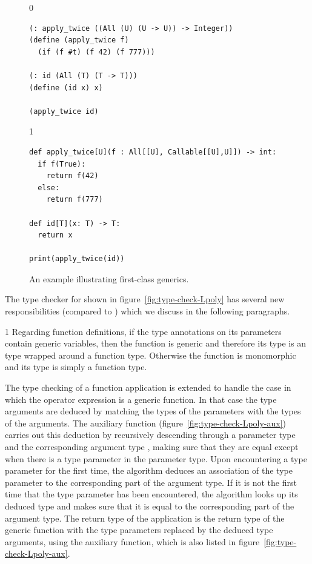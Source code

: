 \documentclass[7x10]{TimesAPriori_MIT}%
\def\racketEd{0}
\def\pythonEd{1}
\def\edition{1}
\newcommand{\pythonColor}[0]{}
\numberwithin{theorem}{chapter}
\numberwithin{definition}{chapter}
\numberwithin{equation}{chapter}
\begin{document}
\begin{figure}[tbp]
\begin{tcolorbox}[colback=white]  
{\if\edition\racketEd
\begin{lstlisting}
(: apply_twice ((All (U) (U -> U)) -> Integer))
(define (apply_twice f)
  (if (f #t) (f 42) (f 777)))

(: id (All (T) (T -> T)))
(define (id x) x)

(apply_twice id)
\end{lstlisting}
\fi}
{\if\edition\pythonEd\pythonColor
\begin{lstlisting}
def apply_twice[U](f : All[[U], Callable[[U],U]]) -> int:
  if f(True):
    return f(42)
  else:
    return f(777)

def id[T](x: T) -> T:
  return x

print(apply_twice(id))
\end{lstlisting}
\fi}
\end{tcolorbox}

\caption{An example illustrating first-class generics.}
\label{fig:apply-twice}
\end{figure}


The type checker for \LangPoly{} shown in
figure~\ref{fig:type-check-Lpoly} has several new responsibilities
(compared to \LangLam{}) which we discuss in the following paragraphs.

{\if\edition\pythonEd\pythonColor
%
Regarding function definitions, if the type annotations on its
parameters contain generic variables, then the function is generic and
therefore its type is an  type wrapped around a function
type. Otherwise the function is monomorphic and its type is simply
a function type.
%
\fi}

The type checking of a function application is extended to handle the
case in which the operator expression is a generic function. In that case
the type arguments are deduced by matching the types of the parameters
with the types of the arguments.
%
The  auxiliary function
(figure~\ref{fig:type-check-Lpoly-aux}) carries out this deduction by
recursively descending through a parameter type  and
the corresponding argument type , making sure that they
are equal except when there is a type parameter in the parameter
type. Upon encountering a type parameter for the first time, the
algorithm deduces an association of the type parameter to the
corresponding part of the argument type. If it is not the first time
that the type parameter has been encountered, the algorithm looks up
its deduced type and makes sure that it is equal to the corresponding
part of the argument type.  The return type of the application is the
return type of the generic function with the type parameters
replaced by the deduced type arguments, using the
 auxiliary function, which is also listed in
figure~\ref{fig:type-check-Lpoly-aux}.
\end{document}
